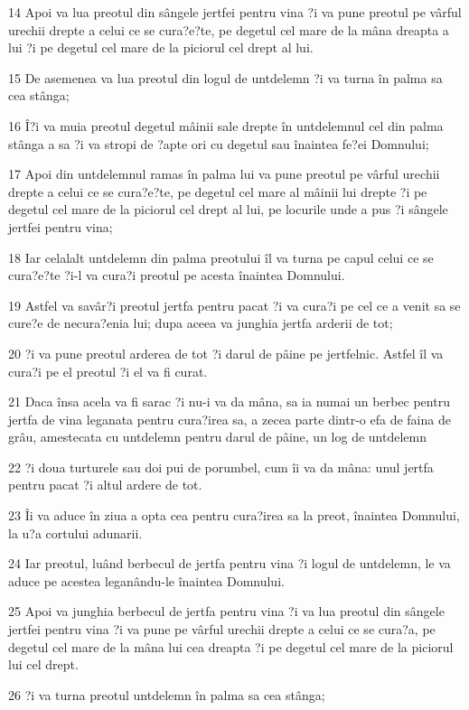 \par 14 Apoi va lua preotul din sângele jertfei pentru vina ?i va pune preotul pe vârful urechii drepte a celui ce se cura?e?te, pe degetul cel mare de la mâna dreapta a lui ?i pe degetul cel mare de la piciorul cel drept al lui.
\par 15 De asemenea va lua preotul din logul de untdelemn ?i va turna în palma sa cea stânga;
\par 16 Î?i va muia preotul degetul mâinii sale drepte în untdelemnul cel din palma stânga a sa ?i va stropi de ?apte ori cu degetul sau înaintea fe?ei Domnului;
\par 17 Apoi din untdelemnul ramas în palma lui va pune preotul pe vârful urechii drepte a celui ce se cura?e?te, pe degetul cel mare al mâinii lui drepte ?i pe degetul cel mare de la piciorul cel drept al lui, pe locurile unde a pus ?i sângele jertfei pentru vina;
\par 18 Iar celalalt untdelemn din palma preotului îl va turna pe capul celui ce se cura?e?te ?i-l va cura?i preotul pe acesta înaintea Domnului.
\par 19 Astfel va savâr?i preotul jertfa pentru pacat ?i va cura?i pe cel ce a venit sa se cure?e de necura?enia lui; dupa aceea va junghia jertfa arderii de tot;
\par 20 ?i va pune preotul arderea de tot ?i darul de pâine pe jertfelnic. Astfel îl va cura?i pe el preotul ?i el va fi curat.
\par 21 Daca însa acela va fi sarac ?i nu-i va da mâna, sa ia numai un berbec pentru jertfa de vina leganata pentru cura?irea sa, a zecea parte dintr-o efa de faina de grâu, amestecata cu untdelemn pentru darul de pâine, un log de untdelemn
\par 22 ?i doua turturele sau doi pui de porumbel, cum îi va da mâna: unul jertfa pentru pacat ?i altul ardere de tot.
\par 23 Îi va aduce în ziua a opta cea pentru cura?irea sa la preot, înaintea Domnului, la u?a cortului adunarii.
\par 24 Iar preotul, luând berbecul de jertfa pentru vina ?i logul de untdelemn, le va aduce pe acestea leganându-le înaintea Domnului.
\par 25 Apoi va junghia berbecul de jertfa pentru vina ?i va lua preotul din sângele jertfei pentru vina ?i va pune pe vârful urechii drepte a celui ce se cura?a, pe degetul cel mare de la mâna lui cea dreapta ?i pe degetul cel mare de la piciorul lui cel drept.
\par 26 ?i va turna preotul untdelemn în palma sa cea stânga;

